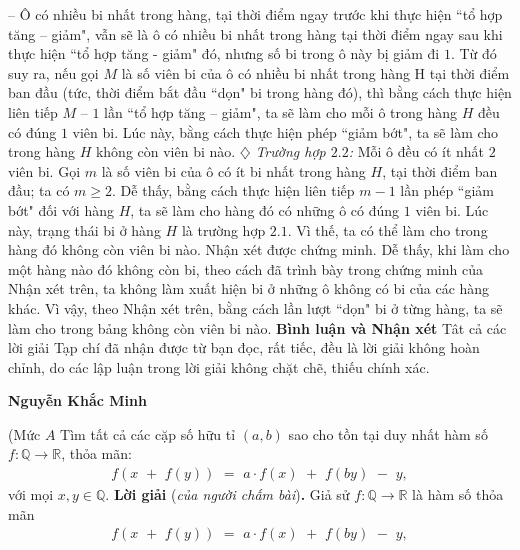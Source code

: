 \begin{multicols}{2}
{	-- Ô có nhiều bi nhất trong hàng, tại thời điểm ngay trước khi thực hiện ``tổ hợp tăng -- giảm", vẫn sẽ là ô có nhiều bi nhất trong hàng tại thời điểm ngay sau khi thực hiện ``tổ hợp tăng - giảm" đó, nhưng số bi trong ô này bị giảm đi $1$.
	\vskip 0.05cm
	Từ đó suy ra, nếu gọi $M$ là số viên bi của ô có nhiều bi nhất trong hàng H tại thời điểm ban đầu (tức, thời điểm bắt đầu ``dọn" bi trong hàng đó), thì bằng cách thực hiện liên tiếp $M$ -- $1$ lần ``tổ hợp tăng -- giảm", ta sẽ làm cho mỗi ô trong hàng $H$ đều có đúng $1$ viên bi. Lúc này, bằng cách thực hiện phép ``giảm bớt", ta sẽ làm cho trong hàng $H$ không còn viên bi nào.
	\vskip 0.05cm
	$\diamondsuit$ \textit{Trường hợp $2.2$:} Mỗi ô đều có ít nhất $2$ viên bi.
	\vskip 0.05cm
	Gọi $m$ là số viên bi của ô có ít bi nhất trong hàng $H$, tại thời điểm ban đầu; ta có $m \ge 2$.
	\vskip 0.05cm
	Dễ thấy, bằng cách thực hiện liên tiếp $m - 1$ lần phép ``giảm bớt" đối với hàng $H$, ta sẽ làm cho hàng đó có những ô có đúng $1$ viên bi. Lúc này, trạng thái bi ở hàng $H$ là trường hợp $2.1$. Vì thế, ta có thể làm cho trong hàng đó không còn viên bi nào.
	\vskip 0.05cm
	Nhận xét được chứng minh.
	\vskip 0.05cm
	Dễ thấy, khi làm cho một hàng nào đó không còn bi, theo cách đã trình bày trong chứng minh của Nhận xét trên, ta không làm xuất hiện bi ở những ô không có bi của các hàng khác. Vì vậy, theo Nhận xét trên, bằng cách lần lượt ``dọn" bi ở từng hàng, ta sẽ làm cho trong bảng không còn viên bi nào.
	\vskip 0.05cm
	\textbf{Bình luận và Nhận xét}
	\vskip 0.05cm
	Tât cả các lời giải Tạp chí đã nhận được từ bạn đọc, rất tiếc, đều là lời giải không hoàn chỉnh, do các lập luận trong lời giải không chặt chẽ, thiếu chính xác.
	\begin{flushright}
		\textbf{Nguyễn Khắc Minh}
	\end{flushright}
	{}
	(Mức $A$ Tìm tất cả các cặp số hữu tỉ $(a, b)$ sao cho tồn tại duy nhất hàm số $f: \mathbb{Q} \to \mathbb{R}$, thỏa mãn:
	\begin{align*}
		f\left( {x\,\, + \,\,f\left( y \right)} \right)\,\, = \,\,a \cdot f\left( x \right)\,\, + \,\,f\left( {by} \right)\,\, - \,\,y,
	\end{align*}
	với mọi $x, y \in \mathbb{Q}$.
	\vskip 0.05cm
	\textbf{Lời giải} (\textit{của người chấm bài})\textbf{.}
	\vskip 0.05cm
	Giả sử $f: \mathbb{Q} \to \mathbb{R}$  là hàm số thỏa mãn
	\begin{align*}
		f\left( {x\,\, + \,\,f\left( y \right)} \right)\,\, = \,\,a \cdot f\left( x \right)\,\, + \,\,f\left( {by} \right)\,\, - \,\,y, \tag{$1$}

\end{align*}}
\end{multicols}
